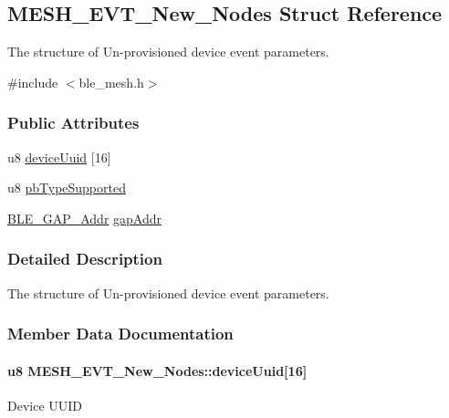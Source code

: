 \hypertarget{struct_m_e_s_h___e_v_t___new___nodes}{}\subsection{M\+E\+S\+H\+\_\+\+E\+V\+T\+\_\+\+New\+\_\+\+Nodes Struct Reference}
\label{struct_m_e_s_h___e_v_t___new___nodes}


The structure of Un-\/provisioned device event parameters.  




{\ttfamily \#include $<$ble\+\_\+mesh.\+h$>$}

\subsubsection*{Public Attributes}
\begin{DoxyCompactItemize}
\item 
u8 \hyperlink{struct_m_e_s_h___e_v_t___new___nodes_afbd08cd967d9fb480c0ddbd081e90d6c}{device\+Uuid} \mbox{[}16\mbox{]}
\item 
u8 \hyperlink{struct_m_e_s_h___e_v_t___new___nodes_a21eb0ad5efff6987fbcda09cb4c192e7}{pb\+Type\+Supported}
\item 
\hyperlink{struct_b_l_e___g_a_p___addr}{B\+L\+E\+\_\+\+G\+A\+P\+\_\+\+Addr} \hyperlink{struct_m_e_s_h___e_v_t___new___nodes_a19485d7ad45684a0a41f49e32553a7b7}{gap\+Addr}
\end{DoxyCompactItemize}


\subsubsection{Detailed Description}
The structure of Un-\/provisioned device event parameters. 

\subsubsection{Member Data Documentation}
\paragraph[{\texorpdfstring{device\+Uuid}{deviceUuid}}]{\setlength{\rightskip}{0pt plus 5cm}u8 M\+E\+S\+H\+\_\+\+E\+V\+T\+\_\+\+New\+\_\+\+Nodes\+::device\+Uuid\mbox{[}16\mbox{]}}\hypertarget{struct_m_e_s_h___e_v_t___new___nodes_afbd08cd967d9fb480c0ddbd081e90d6c}{}\label{struct_m_e_s_h___e_v_t___new___nodes_afbd08cd967d9fb480c0ddbd081e90d6c}
Device U\+U\+ID 
